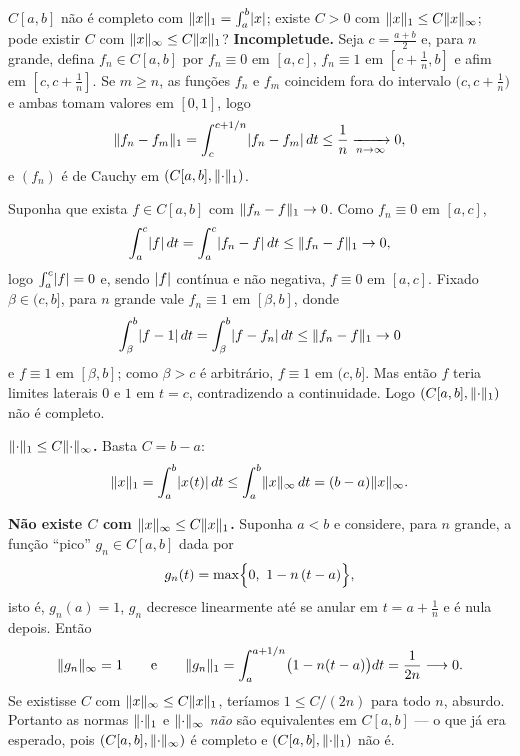 \begin{exercicio}{$C[a,b]$ não é completo com $\lVert x\rVert_1=\int_a^b\lvert x\rvert$; existe $C>0$ com $\lVert x\rVert_1\le C\lVert x\rVert_\infty$; pode existir $C$ com $\lVert x\rVert_\infty\le C\lVert x\rVert_1$?}
\sol
\textbf{Incompletude.} Seja $c=\frac{a+b}{2}$ e, para $n$ grande, defina $f_n\in C[a,b]$ por $f_n\equiv0$ em $[a,c]$, $f_n\equiv1$ em $[c+\frac1n,b]$ e afim em $[c,c+\frac1n]$. Se $m\ge n$, as funções $f_n$ e $f_m$ coincidem fora do intervalo $\bigl(c,c+\frac1n\bigr)$ e ambas tomam valores em $[0,1]$, logo
\[ \lVert f_n-f_m\rVert_1=\int_c^{c+1/n}\lvert f_n-f_m\rvert\,dt\le\frac1n\xrightarrow[n\to\infty]{}0, \]
e $(f_n)$ é de Cauchy em $(C[a,b],\lVert\cdot\rVert_1)$.

Suponha que exista $f\in C[a,b]$ com $\lVert f_n-f\rVert_1\to0$. Como $f_n\equiv0$ em $[a,c]$,
\[ \int_a^{c}\lvert f\rvert\,dt=\int_a^{c}\lvert f_n-f\rvert\,dt\le\lVert f_n-f\rVert_1\to0, \]
logo $\int_a^c\lvert f\rvert=0$ e, sendo $\lvert f\rvert$ contínua e não negativa, $f\equiv0$ em $[a,c]$. Fixado $\beta\in(c,b]$, para $n$ grande vale $f_n\equiv1$ em $[\beta,b]$, donde
\[ \int_\beta^b\lvert f-1\rvert\,dt=\int_\beta^b\lvert f-f_n\rvert\,dt\le\lVert f_n-f\rVert_1\to0 \]
e $f\equiv1$ em $[\beta,b]$; como $\beta>c$ é arbitrário, $f\equiv1$ em $(c,b]$. Mas então $f$ teria limites laterais $0$ e $1$ em $t=c$, contradizendo a continuidade. Logo $(C[a,b],\lVert\cdot\rVert_1)$ não é completo.

\textbf{$\lVert\cdot\rVert_1\le C\lVert\cdot\rVert_\infty$.} Basta $C=b-a$:
\[ \lVert x\rVert_1=\int_a^b\lvert x(t)\rvert\,dt\le\int_a^b\lVert x\rVert_\infty\,dt=(b-a)\lVert x\rVert_\infty. \]

\textbf{Não existe $C$ com $\lVert x\rVert_\infty\le C\lVert x\rVert_1$.} Suponha $a<b$ e considere, para $n$ grande, a função ``pico'' $g_n\in C[a,b]$ dada por
\[ g_n(t)=\max\Bigl\{0,\ 1-n\,(t-a)\Bigr\}, \]
isto é, $g_n(a)=1$, $g_n$ decresce linearmente até se anular em $t=a+\frac1n$ e é nula depois. Então
\[ \lVert g_n\rVert_\infty=1 \qquad\text{e}\qquad \lVert g_n\rVert_1=\int_a^{a+1/n}\bigl(1-n(t-a)\bigr)dt=\frac{1}{2n}\longrightarrow0. \]
Se existisse $C$ com $\lVert x\rVert_\infty\le C\lVert x\rVert_1$, teríamos $1\le C/(2n)$ para todo $n$, absurdo. Portanto as normas $\lVert\cdot\rVert_1$ e $\lVert\cdot\rVert_\infty$ \emph{não} são equivalentes em $C[a,b]$ --- o que já era esperado, pois $(C[a,b],\lVert\cdot\rVert_\infty)$ é completo e $(C[a,b],\lVert\cdot\rVert_1)$ não é.
\end{exercicio}

